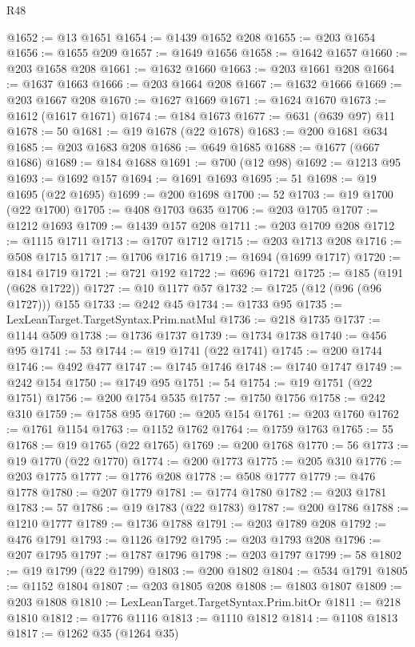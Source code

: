 \begin{lexlean}{R48}
\begin{coremodule}
@1652 := @13 @1651
@1654 := @1439 @1652 @208
@1655 := @203 @1654
@1656 := @1655 @209
@1657 := @1649 @1656
@1658 := @1642 @1657
@1660 := @203 @1658 @208
@1661 := @1632 @1660
@1663 := @203 @1661 @208
@1664 := @1637 @1663
@1666 := @203 @1664 @208
@1667 := @1632 @1666
@1669 := @203 @1667 @208
@1670 := @1627 @1669
@1671 := @1624 @1670
@1673 := @1612 (@1617 @1671)
@1674 := @184 @1673
@1677 := @631 (@639 @97) @11
@1678 := 50
@1681 := @19 @1678 (@22 @1678)
@1683 := @200 @1681 @634
@1685 := @203 @1683 @208
@1686 := @649 @1685
@1688 := @1677 (@667 @1686)
@1689 := @184 @1688
@1691 := @700 (@12 @98)
@1692 := @1213 @95
@1693 := @1692 @157
@1694 := @1691 @1693
@1695 := 51
@1698 := @19 @1695 (@22 @1695)
@1699 := @200 @1698
@1700 := 52
@1703 := @19 @1700 (@22 @1700)
@1705 := @408 @1703 @635
@1706 := @203 @1705
@1707 := @1212 @1693
@1709 := @1439 @157 @208
@1711 := @203 @1709 @208
@1712 := @1115 @1711
@1713 := @1707 @1712
@1715 := @203 @1713 @208
@1716 := @508 @1715
@1717 := @1706 @1716
@1719 := @1694 (@1699 @1717)
@1720 := @184 @1719
@1721 := @721 @192
@1722 := @696 @1721
@1725 := @185 (@191 (@628 @1722))
@1727 := @10 @1177 @57
@1732 := @1725 (@12 (@96 (@96 @1727))) @155
@1733 := @242 @45
@1734 := @1733 @95
@1735 := LexLeanTarget.TargetSyntax.Prim.natMul
@1736 := @218 @1735
@1737 := @1144 @509
@1738 := @1736 @1737
@1739 := @1734 @1738
@1740 := @456 @95
@1741 := 53
@1744 := @19 @1741 (@22 @1741)
@1745 := @200 @1744
@1746 := @492 @477
@1747 := @1745 @1746
@1748 := @1740 @1747
@1749 := @242 @154
@1750 := @1749 @95
@1751 := 54
@1754 := @19 @1751 (@22 @1751)
@1756 := @200 @1754 @535
@1757 := @1750 @1756
@1758 := @242 @310
@1759 := @1758 @95
@1760 := @205 @154
@1761 := @203 @1760
@1762 := @1761 @1154
@1763 := @1152 @1762
@1764 := @1759 @1763
@1765 := 55
@1768 := @19 @1765 (@22 @1765)
@1769 := @200 @1768
@1770 := 56
@1773 := @19 @1770 (@22 @1770)
@1774 := @200 @1773
@1775 := @205 @310
@1776 := @203 @1775
@1777 := @1776 @208
@1778 := @508 @1777
@1779 := @476 @1778
@1780 := @207 @1779
@1781 := @1774 @1780
@1782 := @203 @1781
@1783 := 57
@1786 := @19 @1783 (@22 @1783)
@1787 := @200 @1786
@1788 := @1210 @1777
@1789 := @1736 @1788
@1791 := @203 @1789 @208
@1792 := @476 @1791
@1793 := @1126 @1792
@1795 := @203 @1793 @208
@1796 := @207 @1795
@1797 := @1787 @1796
@1798 := @203 @1797
@1799 := 58
@1802 := @19 @1799 (@22 @1799)
@1803 := @200 @1802
@1804 := @534 @1791
@1805 := @1152 @1804
@1807 := @203 @1805 @208
@1808 := @1803 @1807
@1809 := @203 @1808
@1810 := LexLeanTarget.TargetSyntax.Prim.bitOr
@1811 := @218 @1810
@1812 := @1776 @1116
@1813 := @1110 @1812
@1814 := @1108 @1813
@1817 := @1262 @35 (@1264 @35)

\end{coremodule}
\end{lexlean}
